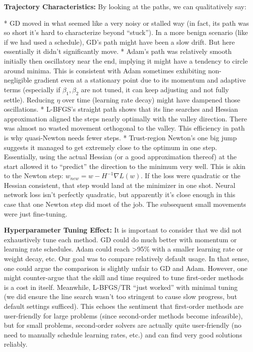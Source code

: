 \documentclass[12pt]{article}
\begin{document}
\textbf{Trajectory Characteristics:} By looking at the paths, we can qualitatively say:

* GD moved in what seemed like a very noisy or stalled way (in fact, its path was so short it’s hard to characterize beyond “stuck”). In a more benign scenario (like if we had used a schedule), GD’s path might have been a slow drift. But here essentially it didn’t significantly move.
* Adam’s path was relatively smooth initially then oscillatory near the end, implying it might have a tendency to circle around minima. This is consistent with Adam sometimes exhibiting non-negligible gradient even at a stationary point due to its momentum and adaptive terms (especially if $\beta_1, \beta_2$ are not tuned, it can keep adjusting and not fully settle). Reducing $\eta$ over time (learning rate decay) might have dampened those oscillations.
* L-BFGS’s straight path shows that its line searches and Hessian approximation aligned the steps nearly optimally with the valley direction. There was almost no wasted movement orthogonal to the valley. This efficiency in path is why quasi-Newton needs fewer steps.
* Trust-region Newton’s one big jump suggests it managed to get extremely close to the optimum in one step. Essentially, using the actual Hessian (or a good approximation thereof) at the start allowed it to “predict” the direction to the minimum very well. This is akin to the Newton step: $w_{new} = w - H^{-1}\nabla L(w)$. If the loss were quadratic or the Hessian consistent, that step would land at the minimizer in one shot. Neural network loss isn’t perfectly quadratic, but apparently it’s close enough in this case that one Newton step did most of the job. The subsequent small movements were just fine-tuning.

\textbf{Hyperparameter Tuning Effect:} It is important to consider that we did not exhaustively tune each method. GD could do much better with momentum or learning rate schedules. Adam could reach >95\% with a smaller learning rate or weight decay, etc. Our goal was to compare relatively default usage. In that sense, one could argue the comparison is slightly unfair to GD and Adam. However, one might counter-argue that the skill and time required to tune first-order methods is a cost in itself. Meanwhile, L-BFGS/TR “just worked” with minimal tuning (we did ensure the line search wasn’t too stringent to cause slow progress, but default settings sufficed). This echoes the sentiment that first-order methods are user-friendly for large problems (since second-order methods become infeasible), but for small problems, second-order solvers are actually quite user-friendly (no need to manually schedule learning rates, etc.) and can find very good solutions reliably.
\end{document}
